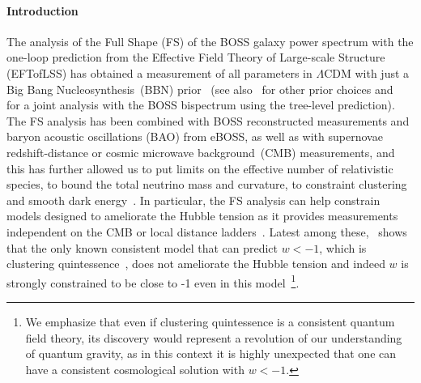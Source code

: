 \documentclass[12pt,a4paper]{article}
\renewcommand{\(}{\left(}
\renewcommand{\)}{\right)}
\begin{document}
\paragraph{Introduction} 
The analysis of the Full Shape (FS) of the BOSS galaxy power spectrum with the one-loop prediction from the Effective Field Theory of Large-scale Structure (EFTofLSS)  has obtained a measurement of all parameters in $\Lambda$CDM with just a Big Bang Nucleosynthesis~(BBN) prior~\cite{DAmico:2019fhj,Ivanov:2019pdj,Colas:2019ret} (see also~\cite{Philcox:2020xbv} for other prior choices and~\cite{DAmico:2019fhj} for a joint analysis with the BOSS bispectrum using the tree-level prediction). 
The FS analysis has been combined with BOSS reconstructed measurements and baryon acoustic oscillations (BAO) from eBOSS, as well as with supernovae redshift-distance or cosmic microwave background~(CMB) measurements, and this has further allowed us to put limits on the effective number of relativistic species, to bound the total neutrino mass and curvature, to constraint clustering and smooth dark energy~\cite{DAmico:2019fhj,Colas:2019ret,Ivanov:2019hqk,Philcox:2020vvt,DAmico:2020kxu,Chudaykin:2020ghx,DAmico:2020tty}. 
In particular, the FS analysis can help constrain models designed to ameliorate the Hubble tension as it provides measurements independent on the CMB or local distance ladders~\cite{DAmico:2020ods,Ivanov:2020ril,Niedermann:2020qbw,Smith:2020rxx,DAmico:2020tty}. Latest among these,~\cite{DAmico:2020tty} shows that the only known consistent model that can predict $w<-1$, which is clustering quintessence~\cite{Creminelli:2006xe}, does not ameliorate the Hubble tension and indeed $w$ is strongly constrained to be close to -1 even in this model~\footnote{We emphasize that even if clustering quintessence is a consistent quantum field theory, its discovery would represent a revolution of our understanding of quantum gravity, as in this context it is highly unexpected that one can have a consistent cosmological solution with $w<-1$.}.
\end{document}
